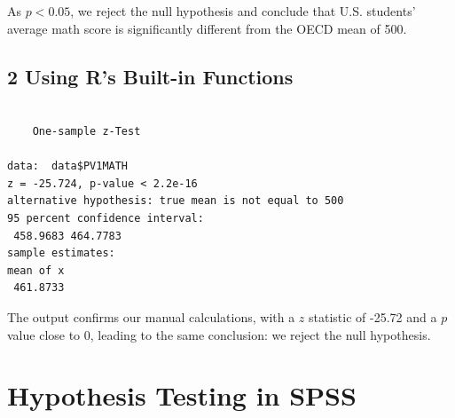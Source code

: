 \documentclass[
  letterpaper,
  DIV=11,
  numbers=noendperiod]{scrreprt}
\newenvironment{Shaded}{\begin{snugshade}}{\end{snugshade}}
\newcommand{\AttributeTok}[1]{\textcolor[rgb]{0.40,0.45,0.13}{#1}}
\newcommand{\CommentTok}[1]{\textcolor[rgb]{0.37,0.37,0.37}{#1}}
\newcommand{\DecValTok}[1]{\textcolor[rgb]{0.68,0.00,0.00}{#1}}
\newcommand{\FunctionTok}[1]{\textcolor[rgb]{0.28,0.35,0.67}{#1}}
\newcommand{\NormalTok}[1]{\textcolor[rgb]{0.00,0.23,0.31}{#1}}
\newcommand{\OtherTok}[1]{\textcolor[rgb]{0.00,0.23,0.31}{#1}}
\newcommand{\SpecialCharTok}[1]{\textcolor[rgb]{0.37,0.37,0.37}{#1}}
\newcommand{\StringTok}[1]{\textcolor[rgb]{0.13,0.47,0.30}{#1}}
\begin{document}
As \(p<0.05\), we reject the null hypothesis and conclude that U.S.
students' average math score is significantly different from the OECD
mean of 500.

\section*{2 Using R's Built-in
Functions}\label{using-rs-built-in-functions}


\begin{Shaded}
\end{Shaded}

\begin{verbatim}

    One-sample z-Test

data:  data$PV1MATH
z = -25.724, p-value < 2.2e-16
alternative hypothesis: true mean is not equal to 500
95 percent confidence interval:
 458.9683 464.7783
sample estimates:
mean of x 
 461.8733 
\end{verbatim}

The output confirms our manual calculations, with a \(z\) statistic of
-25.72 and a \(p\) value close to 0, leading to the same conclusion: we
reject the null hypothesis.


\chapter*{Hypothesis Testing in SPSS}\label{hypothesis-testing-in-spss}

\end{document}
